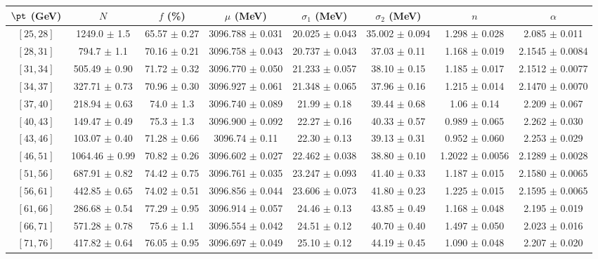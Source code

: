\begin{tabular}{c||c|c|c|c|c|c|c}
$\pt$ (GeV) & $N$ & $f$ (\%) & $\mu$ (MeV) & $\sigma_1$ (MeV) & $\sigma_2$ (MeV) & $n$ & $\alpha$ \\
\hline
$[25, 28]$ & 1249.0 $\pm$ 1.5 & 65.57 $\pm$ 0.27 & 3096.788 $\pm$ 0.031 & 20.025 $\pm$ 0.043 & 35.002 $\pm$ 0.094 & 1.298 $\pm$ 0.028 & 2.085 $\pm$ 0.011\\
$[28, 31]$ & 794.7 $\pm$ 1.1 & 70.16 $\pm$ 0.21 & 3096.758 $\pm$ 0.043 & 20.737 $\pm$ 0.043 & 37.03 $\pm$ 0.11 & 1.168 $\pm$ 0.019 & 2.1545 $\pm$ 0.0084\\
$[31, 34]$ & 505.49 $\pm$ 0.90 & 71.72 $\pm$ 0.32 & 3096.770 $\pm$ 0.050 & 21.233 $\pm$ 0.057 & 38.10 $\pm$ 0.15 & 1.185 $\pm$ 0.017 & 2.1512 $\pm$ 0.0077\\
$[34, 37]$ & 327.71 $\pm$ 0.73 & 70.96 $\pm$ 0.30 & 3096.927 $\pm$ 0.061 & 21.348 $\pm$ 0.065 & 37.96 $\pm$ 0.16 & 1.215 $\pm$ 0.014 & 2.1470 $\pm$ 0.0070\\
$[37, 40]$ & 218.94 $\pm$ 0.63 & 74.0 $\pm$ 1.3 & 3096.740 $\pm$ 0.089 & 21.99 $\pm$ 0.18 & 39.44 $\pm$ 0.68 & 1.06 $\pm$ 0.14 & 2.209 $\pm$ 0.067\\
$[40, 43]$ & 149.47 $\pm$ 0.49 & 75.3 $\pm$ 1.3 & 3096.900 $\pm$ 0.092 & 22.27 $\pm$ 0.16 & 40.33 $\pm$ 0.57 & 0.989 $\pm$ 0.065 & 2.262 $\pm$ 0.030\\
$[43, 46]$ & 103.07 $\pm$ 0.40 & 71.28 $\pm$ 0.66 & 3096.74 $\pm$ 0.11 & 22.30 $\pm$ 0.13 & 39.13 $\pm$ 0.31 & 0.952 $\pm$ 0.060 & 2.253 $\pm$ 0.029\\
$[46, 51]$ & 1064.46 $\pm$ 0.99 & 70.82 $\pm$ 0.26 & 3096.602 $\pm$ 0.027 & 22.462 $\pm$ 0.038 & 38.80 $\pm$ 0.10 & 1.2022 $\pm$ 0.0056 & 2.1289 $\pm$ 0.0028\\
$[51, 56]$ & 687.91 $\pm$ 0.82 & 74.42 $\pm$ 0.75 & 3096.761 $\pm$ 0.035 & 23.247 $\pm$ 0.093 & 41.40 $\pm$ 0.33 & 1.187 $\pm$ 0.015 & 2.1580 $\pm$ 0.0065\\
$[56, 61]$ & 442.85 $\pm$ 0.65 & 74.02 $\pm$ 0.51 & 3096.856 $\pm$ 0.044 & 23.606 $\pm$ 0.073 & 41.80 $\pm$ 0.23 & 1.225 $\pm$ 0.015 & 2.1595 $\pm$ 0.0065\\
$[61, 66]$ & 286.68 $\pm$ 0.54 & 77.29 $\pm$ 0.95 & 3096.914 $\pm$ 0.057 & 24.46 $\pm$ 0.13 & 43.85 $\pm$ 0.49 & 1.168 $\pm$ 0.048 & 2.195 $\pm$ 0.019\\
$[66, 71]$ & 571.28 $\pm$ 0.78 & 75.6 $\pm$ 1.1 & 3096.554 $\pm$ 0.042 & 24.51 $\pm$ 0.12 & 40.70 $\pm$ 0.40 & 1.497 $\pm$ 0.050 & 2.023 $\pm$ 0.016\\
$[71, 76]$ & 417.82 $\pm$ 0.64 & 76.05 $\pm$ 0.95 & 3096.697 $\pm$ 0.049 & 25.10 $\pm$ 0.12 & 44.19 $\pm$ 0.45 & 1.090 $\pm$ 0.048 & 2.207 $\pm$ 0.020\\

\end{tabular}
